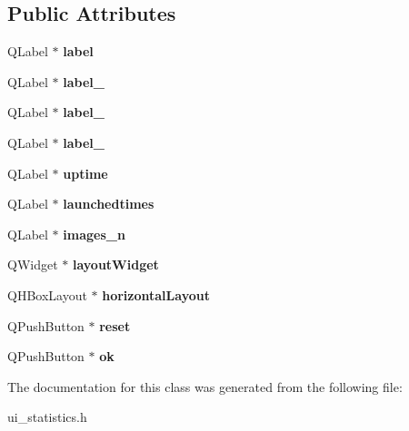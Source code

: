 \subsection*{Public Attributes}
\begin{DoxyCompactItemize}
\item 
\hypertarget{classUi__statistics_aa03ba2f8debd6ef92357bd68eee49d3e}{
QLabel $\ast$ {\bfseries label}}
\label{classUi__statistics_aa03ba2f8debd6ef92357bd68eee49d3e}

\item 
\hypertarget{classUi__statistics_a622e2ab45cdf63133094d4aea40e84a1}{
QLabel $\ast$ {\bfseries label\_}}
\label{classUi__statistics_a622e2ab45cdf63133094d4aea40e84a1}

\item 
\hypertarget{classUi__statistics_a1feecea68d3d1ae66b761c928f3ac3df}{
QLabel $\ast$ {\bfseries label\_}}
\label{classUi__statistics_a1feecea68d3d1ae66b761c928f3ac3df}

\item 
\hypertarget{classUi__statistics_a57bff327d3fa93b039519aab715c5ee3}{
QLabel $\ast$ {\bfseries label\_}}
\label{classUi__statistics_a57bff327d3fa93b039519aab715c5ee3}

\item 
\hypertarget{classUi__statistics_ab29919dcd81d80e4e4806f891a139eb9}{
QLabel $\ast$ {\bfseries uptime}}
\label{classUi__statistics_ab29919dcd81d80e4e4806f891a139eb9}

\item 
\hypertarget{classUi__statistics_ae3ab696ab193f5acd9805bbf79950940}{
QLabel $\ast$ {\bfseries launchedtimes}}
\label{classUi__statistics_ae3ab696ab193f5acd9805bbf79950940}

\item 
\hypertarget{classUi__statistics_a41e33d7ff7fc822cc42c4241fcd792d5}{
QLabel $\ast$ {\bfseries images\_\-n}}
\label{classUi__statistics_a41e33d7ff7fc822cc42c4241fcd792d5}

\item 
\hypertarget{classUi__statistics_a052359da0663988de635a067c75bcc18}{
QWidget $\ast$ {\bfseries layoutWidget}}
\label{classUi__statistics_a052359da0663988de635a067c75bcc18}

\item 
\hypertarget{classUi__statistics_a1b6245891cf40197eaaef9a99e4b20d8}{
QHBoxLayout $\ast$ {\bfseries horizontalLayout}}
\label{classUi__statistics_a1b6245891cf40197eaaef9a99e4b20d8}

\item 
\hypertarget{classUi__statistics_a49748b87d6394907fa71b3ed47c1d9f6}{
QPushButton $\ast$ {\bfseries reset}}
\label{classUi__statistics_a49748b87d6394907fa71b3ed47c1d9f6}

\item 
\hypertarget{classUi__statistics_aac4899f20e5704e171ecb94c71889d44}{
QPushButton $\ast$ {\bfseries ok}}
\label{classUi__statistics_aac4899f20e5704e171ecb94c71889d44}

\end{DoxyCompactItemize}


The documentation for this class was generated from the following file:\begin{DoxyCompactItemize}
\item 
ui\_\-statistics.h\end{DoxyCompactItemize}
